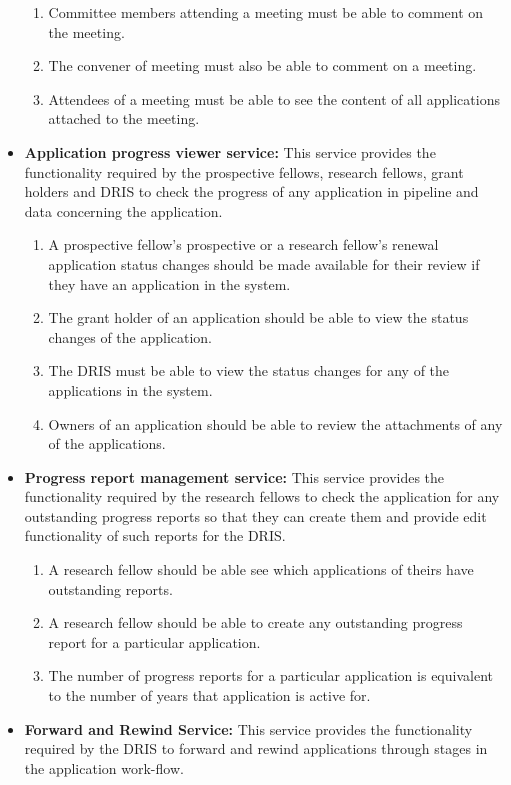 \documentclass[12pt]{article}
\begin{document}
\begin{itemize}
\begin{enumerate}
			\item Committee members attending a meeting must be able to comment on the meeting.  
			\item The convener of meeting must also be able to comment on a meeting.
			\item Attendees of a meeting must be able to see the content of all applications attached to the meeting.		
		\end{enumerate}	
		\item\textbf{Application progress viewer service:}
		This service provides the functionality required by the prospective fellows, research fellows, grant holders and DRIS to check the progress of any application in pipeline and data concerning the application.
		\begin{enumerate}
			\item A prospective fellow's prospective or a research fellow's renewal application status changes should be made available for their review if they have an application in the system.
			\item The grant holder of an application should be able to view the status changes of the application.
			\item The DRIS must be able to view the status changes for any of the applications in the system.
			\item Owners of an application should be able to review the attachments of any of the applications.			
		\end{enumerate}
		\item\textbf{Progress report management service:}
		This service provides the functionality required by the research fellows to check the application for any outstanding progress reports so that they can create them and provide edit functionality of such reports for the DRIS.
		\begin{enumerate}
			\item A research fellow should be able see which applications of theirs have outstanding reports. 
			\item A research fellow should be able to create any outstanding progress report for a particular application. 
			\item The number of progress reports for a particular application is equivalent to the number of years that application is active for.			
		\end{enumerate}
		\item\textbf{Forward and Rewind Service:}
		This service provides the functionality required by the DRIS to forward and rewind applications through stages in the application work-flow.

\end{itemize}
\end{document}
